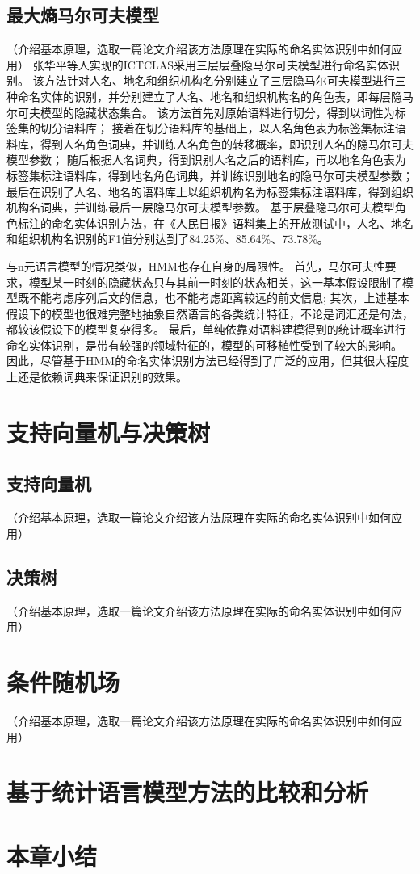 \subsection{最大熵马尔可夫模型}

（介绍基本原理，选取一篇论文介绍该方法原理在实际的命名实体识别中如何应用）
张华平等人实现的ICTCLAS采用三层层叠隐马尔可夫模型进行命名实体识别。
该方法针对人名、地名和组织机构名分别建立了三层隐马尔可夫模型进行三种命名实体的识别，并分别建立了人名、地名和组织机构名的角色表，即每层隐马尔可夫模型的隐藏状态集合。
该方法首先对原始语料进行切分，得到以词性为标签集的切分语料库；
接着在切分语料库的基础上，以人名角色表为标签集标注语料库，得到人名角色词典，并训练人名角色的转移概率，即识别人名的隐马尔可夫模型参数；
随后根据人名词典，得到识别人名之后的语料库，再以地名角色表为标签集标注语料库，得到地名角色词典，并训练识别地名的隐马尔可夫模型参数；
最后在识别了人名、地名的语料库上以组织机构名为标签集标注语料库，得到组织机构名词典，并训练最后一层隐马尔可夫模型参数。
基于层叠隐马尔可夫模型角色标注的命名实体识别方法，在《人民日报》语料集上的开放测试中，人名、地名和组织机构名识别的F1值分别达到了84.25\%、85.64\%、73.78\%。

与n元语言模型的情况类似，HMM也存在自身的局限性。
首先，马尔可夫性要求，模型某一时刻的隐藏状态只与其前一时刻的状态相关，这一基本假设限制了模型既不能考虑序列后文的信息，也不能考虑距离较远的前文信息;
其次，上述基本假设下的模型也很难完整地抽象自然语言的各类统计特征，不论是词汇还是句法，都较该假设下的模型复杂得多。
最后，单纯依靠对语料建模得到的统计概率进行命名实体识别，是带有较强的领域特征的，模型的可移植性受到了较大的影响。
因此，尽管基于HMM的命名实体识别方法已经得到了广泛的应用，但其很大程度上还是依赖词典来保证识别的效果。

\section{支持向量机与决策树}
\subsection{支持向量机}
（介绍基本原理，选取一篇论文介绍该方法原理在实际的命名实体识别中如何应用）
\subsection{决策树}
（介绍基本原理，选取一篇论文介绍该方法原理在实际的命名实体识别中如何应用）


\section{条件随机场}
（介绍基本原理，选取一篇论文介绍该方法原理在实际的命名实体识别中如何应用）
\section{基于统计语言模型方法的比较和分析}
\section{本章小结}

